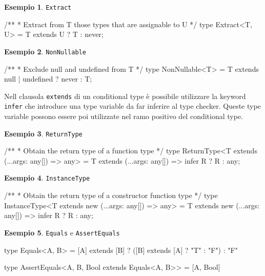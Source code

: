 \documentclass[12pt]{article}
\theoremstyle{definition}
\newtheorem{example}{Esempio}[subsection]
\newenvironment{code}
  {\vspace{0.5cm} \VerbatimEnvironment\begin{typescriptcode}}
  {\end{typescriptcode} \vspace{0.2cm}}
\begin{document}
\begin{example}
\texttt{Extract}

\begin{code}
/**
 * Extract from T those types that are assignable to U
 */
type Extract<T, U> = T extends U ? T : never;
\end{code}
\end{example}

\begin{example}
\texttt{NonNullable}

\begin{code}
/**
 * Exclude null and undefined from T
 */
type NonNullable<T> = T extends null | undefined ? never : T;
\end{code}
\end{example}

Nell clausola \texttt{extends} di un conditional type è possibile utilizzare la keyword \texttt{infer} che introduce
una type variable da far inferire al type checker. Queste type variable possono essere poi utilizzate nel ramo positivo
del conditional type.

\begin{example}
\texttt{ReturnType}

\begin{code}
/**
 * Obtain the return type of a function type
 */
type ReturnType<T extends (...args: any[]) => any> =
  T extends (...args: any[]) => infer R ? R : any;
\end{code}
\end{example}

\begin{example}
\texttt{InstanceType}

\begin{code}
/**
 * Obtain the return type of a constructor function type
 */
type InstanceType<T extends new (...args: any[]) => any> =
  T extends new (...args: any[]) => infer R ? R : any;
\end{code}
\end{example}

\begin{example}
\texttt{Equals} e \texttt{AssertEquals}

\begin{code}
type Equals<A, B> = [A] extends [B] ?
  ([B] extends [A] ? "T" : "F") : "F"

type AssertEquals<A, B, Bool extends Equals<A, B>> = [A, Bool]
\end{code}
\end{example}
\end{document}
